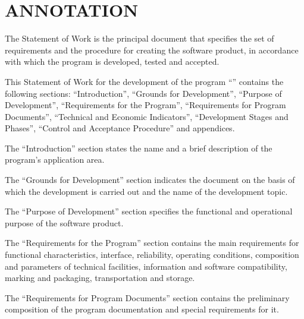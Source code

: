 \documentclass[12pt,a4paper]{extarticle}
\begin{document}
\sloppy




\section*{ANNOTATION}

The Statement of Work is the principal document that specifies the set of requirements and the procedure for creating the software product, in accordance with which the program is developed, tested and accepted.

This Statement of Work for the development of the program \enquote{\hseProjectName} contains the following sections: \enquote{Introduction}, \enquote{Grounds for Development}, \enquote{Purpose of Development}, \enquote{Requirements for the Program}, \enquote{Requirements for Program Documents}, \enquote{Technical and Economic Indicators}, \enquote{Development Stages and Phases}, \enquote{Control and Acceptance Procedure} and appendices\cite{gost19101}.

The \enquote{Introduction} section states the name and a brief description of the program's application area.

The \enquote{Grounds for Development} section indicates the document on the basis of which the development is carried out and the name of the development topic.

The \enquote{Purpose of Development} section specifies the functional and operational purpose of the software product.

The \enquote{Requirements for the Program} section contains the main requirements for functional characteristics, interface, reliability, operating conditions, composition and parameters of technical facilities, information and software compatibility, marking and packaging, transportation and storage.

The \enquote{Requirements for Program Documents} section contains the preliminary composition of the program documentation and special requirements for it.
\end{document}
